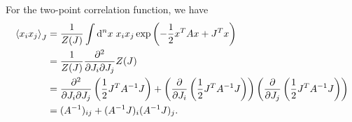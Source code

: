 \documentclass{article}
\begin{document}
For the two-point correlation function, we have
\begin{equation}
    \begin{split}
        \expval{x_i x_j}_J &= \frac{1}{Z(J)} \int \dd^n x \; x_i x_j \exp\left(-\frac{1}{2} x^T A x + J^T x\right)\\
                           &=\frac{1}{Z(J)}\frac{\partial^2}{\partial J_i \partial J_j} Z(J)\\
                           &= \frac{\partial^2}{\partial J_i \partial J_j} \left( \frac{1}{2} J^T A^{-1} J \right) + \left( \frac{\partial}{\partial J_i} \left( \frac{1}{2} J^T A^{-1} J \right) \right) \left( \frac{\partial}{\partial J_j} \left( \frac{1}{2} J^T A^{-1} J \right) \right)\\
                           &=( A^{-1})_{ij} + (A^{-1}J)_i (A^{-1}J)_j.
    \end{split}
\end{equation}
\end{document}

